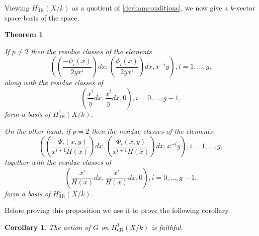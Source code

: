 \documentclass[draft, 11pt]{article} %
\theoremstyle{plain}
\newtheorem{thm}[defn]{Theorem}
\newtheorem{cor}[defn]{Corollary}
\theoremstyle{remark}
\newcommand{\derhamhone}{H_{\text {dR}}^1(X/k)}
\begin{document}
Viewing $\derhamhone$ as a quotient of \eqref{derhamconditions}, we now give a $k$-vector space basis of the space.
\begin{thm}\label{basis}

If $p \neq 2$ then the residue classes of the elements 
\begin{equation}\label{one}
 \left( \left( \frac{-\psi_i(x)}{2yx^i}\right) dx, \left(\frac{\phi_i(x)}{2yx^i}\right) dx, x^{-i}y\right), i=1, \ldots ,g,
\end{equation}
along with the residue classes of 
\begin{equation}\label{two}
 \left( \frac{x^{i}}{y} dx , \frac{x^{i}}{y} dx, 0 \right), i = 0,\ldots ,g-1,
\end{equation}
form a basis of $\derhamhone$.

On the other hand, if $p=2$ then the residue classes of the elements 
\begin{equation}\label{three}
\left( \left(\frac{-\Psi_i(x,y)}{x^{i+1}H(x)}\right) dx, \left( \frac{\Phi_i(x,y)}{x^{i+1}H(x)} \right) dx, x^{-i}y \right), i =1, \ldots , g,
\end{equation}
together with the residue classes of 
\begin{equation}\label{four}
\left( \frac{x^{i}}{H(x)} dx, \frac{x^{i}}{H(x)} dx, 0 \right), i=0, \ldots, g-1,
\end{equation}
form a basis of $\derhamhone$.
\end{thm}

Before proving this proposition we use it to prove the following corollary.

\begin{cor}
The action of $G$ on $\derhamhone$ is faithful.
\end{cor}
\end{document}

